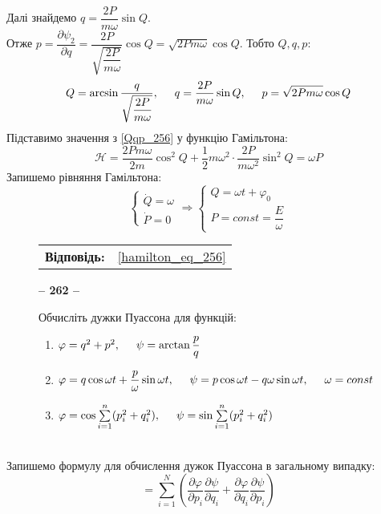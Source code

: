 \documentclass[a4paper,12pt]{article}
\newenvironment{task}[1]{\begin{figure*}[htp]\begin{framed}\begin{center}\textbf{-- {#1} --}\end{center}}{\end{framed}\end{figure*}}
\newenvironment{ans}[0]{\begin{figure*}[htp]\begin{center}\begin{tabular}{lc}\textbf{Відповідь:}\tab&}{\end{tabular}\end{center}\end{figure*}}
\newcommand\partiald[2]{\dfrac{\partial{#1}}{\partial{#2}}}
\newcommand\tab [1][0.5cm]{\hspace*{#1}}
\begin{document}
\begin{justify}
		Далі знайдемо $q=\dfrac{2P}{m\omega}\sin Q$.
		\\Отже $p=\dfrac{\partial\psi_2}{\partial q}=\dfrac{2P}{\sqrt{\dfrac{2P}{m\omega}}}\cos Q=\sqrt{2Pm\omega}\cos Q$. Тобто $Q, q, p:$
		\begin{equation}
			Q=\arcsin\dfrac{q}{\sqrt{\dfrac{2P}{m\omega}}},\tab q=\dfrac{2P}{m\omega}\sin Q,\tab p=\sqrt{2Pm\omega}\cos Q
			\label{Qqp_256}
		\end{equation}
		Підставимо значення з \cref{Qqp_256} у функцію Гамільтона:
		\begin{equation}
			\mathcal{H}=\dfrac{2Pm\omega}{2m}\cos^2Q+\dfrac12m\omega^2\cdot\dfrac{2P}{m\omega^2}\sin^2Q=\omega P
			\label{hamilton_func_256}
		\end{equation}
		Запишемо рівняння Гамільтона:
		\begin{equation}
			\left\{\begin{array}{l}
				\dot{Q}=\omega\\\dot{P}=0
			\end{array}\right.\Longrightarrow\left\{\begin{array}{l}
				Q=\omega t+\varphi_0\\P=const=\dfrac{E}{\omega}
			\end{array}\right.
			\label{hamilton_eq_256}
		\end{equation}
		\begin{ans}
			\cref{hamilton_eq_256}
		\end{ans}
		\begin{task}{262}
			Обчисліть дужки Пуассона для функцій:
			\begin{enumerate}[label=\alph*)]
				\item $\varphi=q^2+p^2,\tab\psi=\arctan\dfrac pq$
				\item $\varphi=q\cos\omega t+\dfrac p\omega\sin\omega t,\tab \psi=p\cos\omega t-q\omega\sin\omega t,\tab\omega=const$
				\item $\varphi=\cos\sum\limits_{i=1}^n(p_i^2+q_i^2),\tab\psi=\sin\sum\limits_{i=1}^n(p_i^2+q_i^2)$
			\end{enumerate}
		\end{task}\\
		Запишемо формулу для обчислення дужок Пуассона в загальному випадку:
		\begin{equation}
			[\varphi,\psi]=\sum\limits_{i=1}^N\left(\partiald{\varphi}{p_i}\partiald{\psi}{q_i}+\partiald{\varphi}{q_i}\partiald{\psi}{p_i}\right)
			\label{general_poisson_262}
		\end{equation}

\end{justify}
\end{document}
